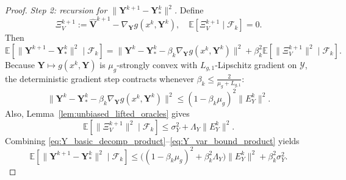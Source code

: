 \documentclass{pkumelon}
\theoremstyle{plain}
\newcommand{\E}{\mathbb{E}}
\begin{document}
\begin{proof}
\emph{Step 2: recursion for $\|\boldsymbol Y^{k+1}-\boldsymbol Y_*^k\|^2$.} Define
\begin{equation*}
\Xi_V^{k+1} := \widehat{\boldsymbol V}^{k+1}-\nabla_{\boldsymbol Y}g(x^k,\boldsymbol Y^k), \quad \E[\Xi_V^{k+1}\mid \mathcal F_k]=0.
\end{equation*}
Then
\begin{equation}\label{eq:Y_basic_decomp_product}
\E[\|\boldsymbol Y^{k+1}-\boldsymbol Y_*^k\|^2\mid \mathcal F_k]
=
\|\boldsymbol Y^k-\boldsymbol Y_*^k-\beta_k\nabla_{\boldsymbol Y}g(x^k,\boldsymbol Y^k)\|^2
+\beta_k^2\E[\|\Xi_V^{k+1}\|^2\mid \mathcal F_k].
\end{equation}
Because $\boldsymbol Y\mapsto g(x^k,\boldsymbol Y)$ is $\mu_g$-strongly convex with $L_{g,1}$-Lipschitz gradient on $\mathcal Y$, the deterministic gradient step contracts whenever $\beta_k\le \frac{2}{\mu_g+L_{g,1}}$:
\begin{equation}\label{eq:gd_contract_product_Y}
\|\boldsymbol Y^k-\boldsymbol Y_*^k-\beta_k\nabla_{\boldsymbol Y}g(x^k,\boldsymbol Y^k)\|^2
\le
(1-\beta_k\mu_g)^2\|E_Y^k\|^2.
\end{equation}
Also, Lemma~\ref{lem:unbiased_lifted_oracles} gives
\begin{equation}\label{eq:Y_var_bound_product}
\E[\|\Xi_V^{k+1}\|^2\mid \mathcal F_k]
\le
\sigma_Y^2+\Lambda_Y\|E_Y^k\|^2.
\end{equation}
Combining \eqref{eq:Y_basic_decomp_product}--\eqref{eq:Y_var_bound_product} yields
\begin{equation}\label{eq:Y_track_to_Yk_product}
\E[\|\boldsymbol Y^{k+1}-\boldsymbol Y_*^k\|^2\mid \mathcal F_k]
\le
\bigl((1-\beta_k\mu_g)^2+\beta_k^2\Lambda_Y\bigr)\|E_Y^k\|^2
+\beta_k^2\sigma_Y^2.
\end{equation}


\end{proof}
\end{document}
